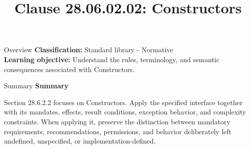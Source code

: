 \documentclass[10pt,letterpaper]{article}
\title{Clause 28.06.02.02: Constructors}
\author{}
\date{}
\begin{document}
\maketitle
\begin{CornellOverviewBox}{Overview}
\textbf{Classification:} Standard library - Normative\\[2pt]
\textbf{Learning objective:} Understand the rules, terminology, and semantic consequences associated with Constructors.
\end{CornellOverviewBox}\begin{CornellSummaryBox}{Summary}
{\sffamily\bfseries\color{Accent} Summary}\par\vspace{3pt}Section 28.6.2.2 focuses on Constructors. Apply the specified interface together with its mandates, effects, result conditions, exception behavior, and complexity constraints. When applying it, preserve the distinction between mandatory requirements, recommendations, permissions, and behavior deliberately left undefined, unspecified, or implementation-defined.
\end{CornellSummaryBox}
\end{document}
